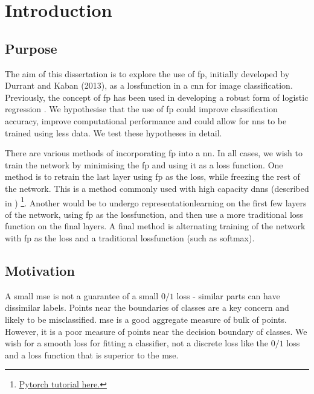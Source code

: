 \chapter{Introduction}

\section{Purpose}

The aim of this dissertation is to explore the use of  \gls{fp}, initially developed by Durrant and Kaban (2013)\cite{durrant2013sharp}, as a \gls{lossfunction} in a \gls{cnn} for image classification. Previously, the concept of  \gls{fp} has been used in developing a robust form of logistic regression \cite{label_noise}. We hypothesise that the use of  \gls{fp} could improve classification accuracy, improve computational performance and could allow for \gls{nn}s to be trained using less data. We test these hypotheses in detail. 
\bigskip

There are various methods of incorporating  \gls{fp} into a  \gls{nn}. In all cases, we wish to train the network by minimising the \gls{fp} and using it as a loss function. One method is to retrain the last layer using  \gls{fp} as the loss, while freezing the rest of the network. This is a method commonly used with high capacity \gls{dnn}s (described in \cite{transfer_learning}) \footnote{\href{https://pytorch.org/tutorials/beginner/transfer_learning_tutorial.html}{Pytorch tutorial here.}}. Another would be to undergo \gls{representationlearning} on the first few \gls{layer}s of the network, using  \gls{fp} as the \gls{lossfunction}, and then use a more traditional loss function on the final layers. A final method is alternating training of the network with  \gls{fp} as the \gls{loss} and a traditional \gls{lossfunction} (such as \gls{softmax}). 
\bigskip

\section{Motivation}

A small  \gls{mse} is not a guarantee of a small $0/1$ loss - similar parts can have dissimilar labels. Points near the boundaries of classes are a key concern and likely to be misclassified.  \gls{mse} is a good aggregate measure of bulk of points. However, it is a poor measure of points near the decision boundary of classes. We wish for a smooth loss for fitting a classifier, not a discrete loss like the $0/1$ loss and a loss function that is superior to the  \gls{mse}.

